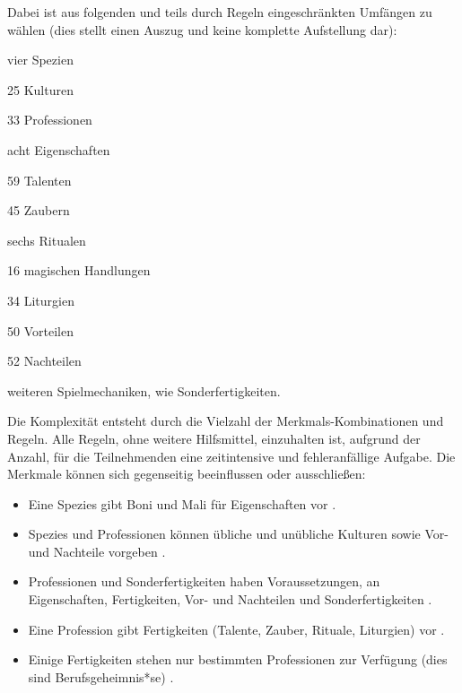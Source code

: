 Dabei ist aus folgenden und teils durch Regeln eingeschränkten Umfängen zu wählen (dies stellt einen Auszug und keine komplette Aufstellung dar):%
\begin{itemize*}[label={}, itemjoin={,}, itemjoin*={{ und}}]%
    \item vier Spezien
    \item 25 Kulturen
    \item 33 Professionen
    \item acht Eigenschaften
    \item 59 Talenten
    \item 45 Zaubern
    \item sechs Ritualen
    \item 16 magischen Handlungen
    \item 34 Liturgien
    \item 50 Vorteilen
    \item 52 Nachteilen
    \item weiteren Spielmechaniken, wie  Sonderfertigkeiten.
\end{itemize*}

Die Komplexität entsteht durch die Vielzahl der Merkmals-Kombinationen und Regeln.
Alle Regeln, ohne weitere Hilfsmittel, einzuhalten ist, aufgrund der Anzahl, für die Teilnehmenden eine zeitintensive und fehleranfällige Aufgabe.
Die \og Merkmale können sich \bspw gegenseitig beeinflussen oder ausschließen:
\begin{itemize}
    \item Eine Spezies gibt Boni und Mali für Eigenschaften vor .
    \item Spezies und Professionen können übliche und unübliche Kulturen sowie Vor- und Nachteile vorgeben .
    \item Professionen und Sonderfertigkeiten haben Voraussetzungen, \uA \ggf an Eigenschaften, Fertigkeiten, Vor- und Nachteilen und Sonderfertigkeiten .
    \item Eine Profession gibt Fertigkeiten (Talente, Zauber, Rituale, Liturgien) vor .
    \item Einige Fertigkeiten stehen nur bestimmten Professionen zur Verfügung (dies sind \sog Berufsgeheimnis*se) .
\end{itemize}

